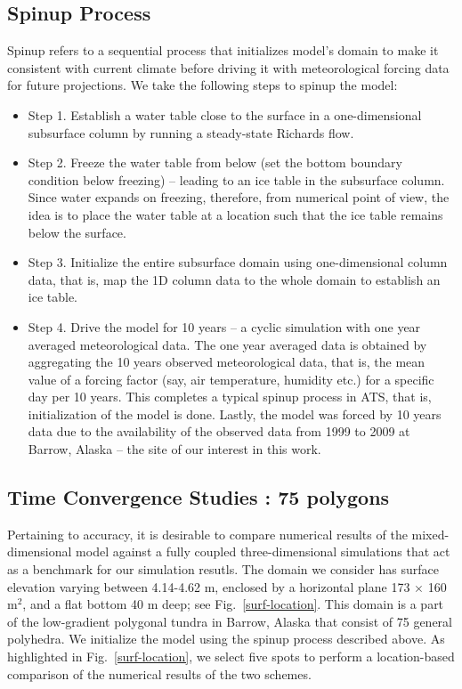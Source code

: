 \documentclass[review]{elsarticle}
\begin{document}
\subsection{Spinup Process}
Spinup refers to a sequential process that initializes model's domain to make it consistent with current climate before driving it with meteorological forcing data for future projections. We take the following steps to spinup the model:
\begin{itemize}
\item{ Step 1. Establish a water table close to the surface in a one-dimensional subsurface column by running a steady-state Richards flow.}
\item{Step 2. Freeze the water table from below (set the bottom boundary condition below freezing) -- leading to an ice table in the subsurface column. Since water expands on freezing, therefore, from numerical point of view, the idea is to place the water table at a location such that the ice table remains below the surface.}
\item{Step 3. Initialize the entire subsurface domain using one-dimensional column data, that is, map the 1D column data to the whole domain to establish an ice table.
}
\item{Step 4. Drive the model for 10 years -- a cyclic simulation with one year averaged meteorological data. The one year averaged data is obtained by aggregating the 10 years observed meteorological data, that is, the mean value of a forcing factor (say, air temperature, humidity etc.) for a specific day per 10 years. This completes a typical spinup process in ATS, that is, initialization of the model is done. Lastly, the model was forced by 10 years data due to the availability of the observed data from 1999 to 2009 at Barrow, Alaska -- the site of our interest in this work.}
 \end{itemize}
 
 \subsection {Time Convergence Studies : 75 polygons}           
 
Pertaining to accuracy,  it is desirable to compare numerical results of the mixed-dimensional model against a fully coupled three-dimensional simulations that act as a benchmark for our simulation resutls. The domain we consider has surface elevation varying between 4.14-4.62 m, enclosed by a horizontal plane 173 $\times$ 160 m$^2$, and a flat bottom 40 m deep; see Fig.~\ref{surf-location}. This domain is a part of the low-gradient polygonal tundra in Barrow, Alaska that consist of 75 general polyhedra. We initialize the model using the spinup process described above. As highlighted in Fig.~\ref{surf-location}, we select five spots to perform a location-based comparison of the numerical results of the two schemes.
\end{document}
